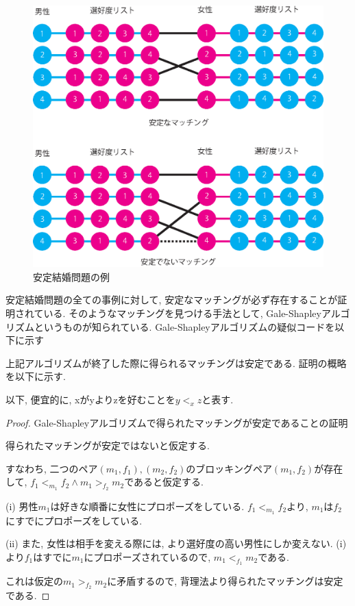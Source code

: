 \documentclass[12pt]{jarticle}
\begin{document}
\begin{figure}
  \begin{center}
    \includegraphics[scale=0.5]{image/match.eps}
  \end{center}
  \caption{安定結婚問題の例}
  \label{match}
\end{figure}

安定結婚問題の全ての事例に対して, 安定なマッチングが必ず存在することが証明されている.
\def\gsa{Gale-Shapleyアルゴリズム}
そのようなマッチングを見つける手法として, \gsa というものが知られている.
\gsa の疑似コードを以下に示す



上記アルゴリズムが終了した際に得られるマッチングは安定である.
証明の概略を以下に示す.

以下, 便宜的に, xがyよりzを好むことを$y <_x z$と表す.

\begin{proof}
\gsa で得られたマッチングが安定であることの証明

得られたマッチングが安定ではないと仮定する.

すなわち, 二つのペア$(m_1, f_1), (m_2, f_2)$のブロッキングペア$(m_1, f_2)$が存在して, $f_1 <_{m_1} f_2 \land m_1 >_{f_2}m_2$であると仮定する.

(i) 男性$m_1$は好きな順番に女性にプロポーズをしている. $f_1 <_{m_1} f_2$より, $m_1$は$f_2$にすでにプロポーズをしている.

(ii) また, 女性は相手を変える際には, より選好度の高い男性にしか変えない. (i)より$f_1$はすでに$m_1$にプロポーズされているので, $m_1 <_{f_1} m_2$である.

これは仮定の$m_1 >_{f_2}m_2$に矛盾するので, 背理法より得られたマッチングは安定である.

\end{proof}
\end{document}
